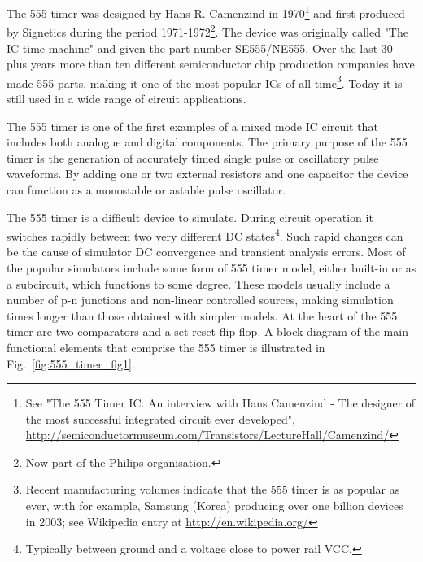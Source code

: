 %
%
%
%

\renewcommand{\thesubfigure}{\thefigure(\alph{subfigure})}
\makeatletter
  \renewcommand{\@thesubfigure}{\thesubfigure:\space}
  \renewcommand{\p@subfigure}{}
\makeatother

\renewcommand{\thesubtable}{\thetable(\alph{subtable})}
\makeatletter
  \renewcommand{\@thesubtable}{\thesubtable:\space}
  \renewcommand{\p@subtable}{}
\makeatother


The 555 timer was designed by Hans R. Camenzind in 1970\footnote{See "The 555 Timer IC. An interview with Hans Camenzind - The designer of the most successful integrated circuit ever developed", 
\url{http://semiconductormuseum.com/Transistors/LectureHall/Camenzind/} } and first produced by Signetics during the period 1971-1972\footnote{Now part of the Philips organisation.}. The device was originally called "The IC time machine" and given the part number SE555/NE555.   Over the last 30 plus years more than ten different semiconductor chip production companies have made 555 parts, making it one of the most popular ICs of all time\footnote{Recent manufacturing volumes indicate that the 555 timer is as popular as ever, with for example, Samsung (Korea) producing over one billion devices in 2003; see Wikipedia entry at  \url{http://en.wikipedia.org/}}.  Today it is still used in a wide range of circuit applications. 

\addvspace{12pt}

The 555 timer is one of the first examples of a mixed mode IC circuit that includes both analogue and digital components.
The primary purpose of the 555 timer is the generation of accurately timed single pulse or oscillatory pulse waveforms.  By adding one or two external resistors and one capacitor the device can function as a monostable or astable pulse oscillator. 

\addvspace{12pt}

The 555 timer is a difficult device to simulate. During circuit operation it switches rapidly between two very different DC states\footnote{Typically between ground and a voltage close to power rail VCC.}. Such rapid changes can be the cause of simulator DC convergence and transient analysis errors.  Most of the popular simulators include some form of 555 timer model, either built-in or as a subcircuit, which functions to some degree.  These models usually include a number of p-n junctions and non-linear controlled sources, making simulation times longer than those obtained with simpler models.  At the heart of the 555 timer are two comparators and a set-reset flip flop. A block diagram of the main functional elements that comprise the 555 timer is illustrated in Fig.~\ref{fig:555_timer_fig1}.  

